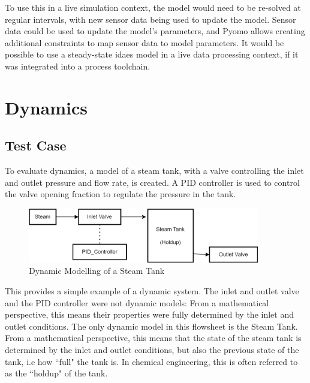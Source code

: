 \documentclass[12pt]{article}
\begin{document}

To use this in a live simulation context, the model would need to be re-solved at regular intervals, with new sensor data being used to update the model. Sensor data could be used to update the model's parameters, and Pyomo allows creating additional constraints to map sensor data to model parameters. It would be possible to use a steady-state idaes model in a live data processing context, if it was integrated into a process toolchain.


\section{Dynamics} \label{sec:dynamics}


\subsection{Test Case}

To evaluate dynamics, a model of a steam tank, with a valve controlling the inlet and outlet pressure and flow rate, is created. A PID controller is used to control the valve opening fraction to regulate the pressure in the tank.

\begin{figure}
    \includegraphics[width=0.9\textwidth]{../dynamicmodelling.png}
    \caption{Dynamic Modelling of a Steam Tank}
    \label{fig:dynamicmodelling}
\end{figure}

This provides a simple example of a dynamic system. The inlet and outlet valve and the PID controller were not dynamic models: From a mathematical perspective, this means their properties were fully determined by the inlet and outlet conditions. The only dynamic model in this flowsheet is the Steam Tank. From a mathematical perspective, this means that the state of the steam tank is determined by the inlet and outlet conditions, but also the previous state of the tank, i.e how ``full" the tank is. In chemical engineering, this is often referred to as the ``holdup" of the tank.

\end{document}
